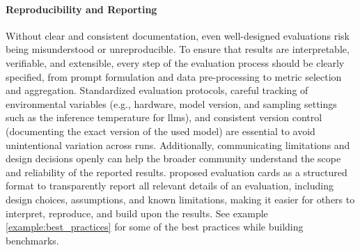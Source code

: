 \paragraph{Reproducibility and Reporting} Without clear and consistent documentation, even well-designed evaluations risk being misunderstood or unreproducible. 
To ensure that results are interpretable, verifiable, and extensible, every step of the evaluation process should be clearly specified, from prompt formulation and data pre-processing to metric selection and aggregation. 
Standardized evaluation protocols, careful tracking of environmental variables (e.g., hardware, model version, and sampling settings such as the inference temperature for \glspl{llm}), and consistent version control (documenting the exact version of the used model) are essential to avoid unintentional variation across runs. 
Additionally, communicating limitations and design decisions openly can help the broader community understand the scope and reliability of the reported results. 
\textcite{alampara2025lessons} proposed evaluation cards as a structured format to transparently report all relevant details of an evaluation, including design choices, assumptions, and known limitations, making it easier for others to interpret, reproduce, and build upon the results. See example \ref{example:best_practices} for some of the best practices while building benchmarks.


